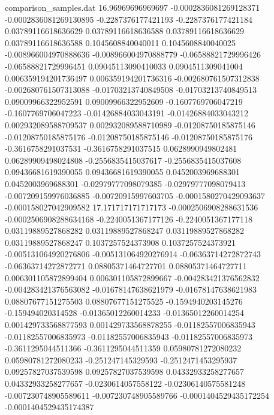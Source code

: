 \begin{filecontents}{comparison_samples.dat}
16.96969696969697   -0.0002836081269128371  -0.0002836081269130895  -0.2287376177421193    -0.2287376177421184    0.03789116618636629    0.03789116618636588    0.03789116618636629    0.03789116618636588    0.1045608840040011     0.1045608840040025     -0.008966004970888636   -0.008966004970888779   -0.06588821729996426   -0.06588821729996451   0.09045113090410033     0.0904511309041004      0.006359194201736497    0.006359194201736316    -0.002680761507312838   -0.002680761507313088   -0.01703213740849508    -0.01703213740849513    0.09009966322952591     0.09009966322952609     -0.1607769706047219     -0.1607769706047223     -0.01426884033043191   -0.01426884033043212   0.002932089588709537   0.002932089588710989   -0.01208750185875146    -0.01208750185875176    -0.01208750185875146    -0.01208750185875176    -0.3616758291037531    -0.3616758291037515    0.0628990949802481      0.06289909498024808     -0.2556835415037617    -0.2556835415037608    0.09436681619390055     0.09436681619390055     0.0452003969688301      0.0452003969688301      -0.02979777098079385   -0.02979777098079413   -0.007209159976036885  -0.00720915997603705   -0.0001580270429093637  -0.000158027042909582 
17.171717171717173  -0.0002506908288631536  -0.0002506908288634168  -0.2240051367177126    -0.2240051367177118    0.03119889527868282    0.03119889527868247    0.03119889527868282    0.03119889527868247    0.1037257524373908     0.1037257524373921     -0.005131064920276806   -0.005131064920276914   -0.06363714272872743   -0.06363714272872771   0.08805371464727701     0.08805371464727711     0.006301105872899404    0.006301105872899667    -0.004283421376562832   -0.004283421376563082   -0.01678147638621979    -0.01678147638621983    0.08807677151275503     0.08807677151275525     -0.1594940203145276     -0.159494020314528      -0.01365012260014233   -0.01365012260014254   0.001429733568877593   0.001429733568878255   -0.01182557006835943    -0.01182557006835973    -0.01182557006835943    -0.01182557006835973    -0.3611295044511366    -0.3611295044511359    0.05980781272080232     0.05980781272080233     -0.251247145329593     -0.2512471453295937    0.09257827037539598     0.09257827037539598     0.04332933258277657     0.04332933258277657     -0.0230614057558122    -0.02306140575581248   -0.007230748905589611  -0.007230748905589766  -0.0001404529435172254  -0.0001404529435174387

\end{filecontents}
